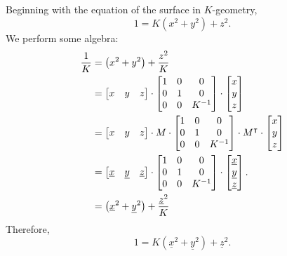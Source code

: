 \documentclass[newpage,hints,handout,noauthor,nooutcomes,12pt]{ximera}
\begin{document}
\begin{problem}
\begin{freeResponse}
Beginning with the equation of the surface in $K$-geometry, 
\[
1 = K\left(x^2 + y^2\right) +z^2.
\]
We perform some algebra:
\begin{align*}
\frac{1}{K} &= \left(x^2 +y^2 \right) + \frac{z^2}{K}\\
&=
\begin{bmatrix}
x & y & z%
\end{bmatrix}  \cdot\begin{bmatrix}
1 & 0 & 0\\
0 & 1 & 0\\
0 & 0 & K^{-1}%
\end{bmatrix}  \cdot
\begin{bmatrix}
x\\
y\\
z%
\end{bmatrix} \\
&= \begin{bmatrix}
    x & y & z
  \end{bmatrix} \cdot M \cdot
\begin{bmatrix}
1 & 0 & 0\\
0 & 1 & 0\\
0 & 0 & K^{-1}%
\end{bmatrix}  \cdot M^\transpose \cdot
\begin{bmatrix}
    x \\ y \\  z
  \end{bmatrix} \\
 &= \begin{bmatrix}
    \underline{x} & \underline{y} & \underline{z}
  \end{bmatrix} \cdot 
\begin{bmatrix}
1 & 0 & 0\\
0 & 1 & 0\\
0 & 0 & K^{-1}%
\end{bmatrix}  \cdot 
\begin{bmatrix}
    \underline{x} \\ \underline{y} \\  \underline{z}
  \end{bmatrix}. \\
 &= \left(\underline{x}^2 +\underline{y}^2 \right) + \frac{\underline{z}^2}{K}
\end{align*}
Therefore,
\[
1 = K\left(\underline{x}^2 + \underline{y}^2\right) +\underline{z}^2.
\] 
\end{freeResponse}
\end{problem}
\end{document}
